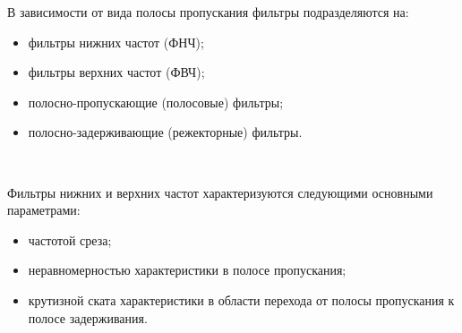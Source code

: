 \documentclass{beamer}
\begin{document}
\begin{frame}
В зависимости от вида полосы пропускания фильтры подразделяются на:
\begin{itemize}
  \item фильтры нижних частот (ФНЧ);
  \item фильтры верхних частот (ФВЧ);
  \item полосно-пропускающие (полосовые) фильтры;
  \item полосно-задерживающие (режекторные) фильтры.
\end{itemize}

~

Фильтры нижних и верхних частот характеризуются следующими основными параметрами:
\begin{itemize}
  \item частотой среза;
  \item неравномерностью характеристики в полосе пропускания;
  \item крутизной ската характеристики в области перехода от полосы пропускания к полосе задерживания.
\end{itemize}
\end{frame}

\begin{frame}
\end{frame}

\begin{frame}
\end{frame}
\end{document}
